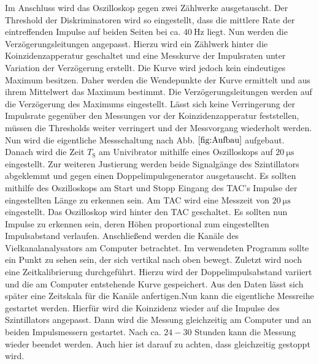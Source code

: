  Im Anschluss wird das Oszilloskop gegen zwei Zählwerke ausgetauscht. Der Threshold der Diskriminatoren wird so eingestellt, dass die mittlere Rate der eintreffenden Impulse auf beiden Seiten bei ca. $\SI{40}{\hertz}$ liegt. Nun werden die Verzögerungsleitungen angepasst. Hierzu wird ein Zählwerk hinter die Koinzidenzapperatur geschaltet und eine Messkurve der Impulsraten unter Variation der Verzögerung erstellt. Die Kurve wird jedoch kein eindeutiges Maximum besitzen. Daher werden die Wendepunkte der Kurve ermittelt und aus ihrem Mittelwert das Maximum bestimmt. Die Verzögerungsleitungen werden auf die Verzögerung des Maximums eingestellt. Lässt sich keine Verringerung der Impulsrate gegenüber den Messungen vor der Koinzidenzapperatur feststellen, müssen die Thresholds weiter verringert und der Messvorgang wiederholt werden. Nun wird die eigentliche Messschaltung nach Abb. $\ref{fig:Aufbau}$ aufgebaut. Danach wird die Zeit $T_\text{S}$ am Univibrator mithilfe eines Oszilloskops auf $\SI{20}{\micro\second}$ eingestellt. Zur weiteren Justierung werden beide Signalgänge des Szintillators abgeklemmt und gegen einen Doppelimpulsgenerator ausgetauscht. Es sollten mithilfe des Oszilloskops am Start und Stopp Eingang des TAC's Impulse der eingestellten Länge zu erkennen sein. Am TAC wird eine Messzeit von $\SI{20}{\micro\second}$ eingestellt. Das Oszilloskop wird hinter den TAC geschaltet. Es sollten nun Impulse zu erkennen sein, deren Höhen proportional zum eingestellten Impulsabstand verlaufen. Anschließend werden die Kanäle des Vielkanalanalysators am Computer betrachtet. Im verwendeten Programm sollte  ein Punkt zu sehen sein, der sich vertikal nach oben bewegt. Zuletzt wird noch eine Zeitkalibrierung durchgeführt. Hierzu wird der Doppelimpulsabstand variiert und die am Computer entstehende Kurve gespeichert. Aus den Daten lässt sich später eine Zeitskala für die Kanäle anfertigen.Nun kann die eigentliche Messreihe gestartet werden. Hierfür wird die Koinzidenz wieder auf die Impulse des Szintillators angepasst. Dann wird die Messung gleichzeitig am Computer und an beiden Impulsmessern gestartet. Nach ca. $24-30$ Stunden kann die Messung wieder beendet werden. Auch hier ist darauf zu achten, dass gleichzeitig gestoppt wird.  